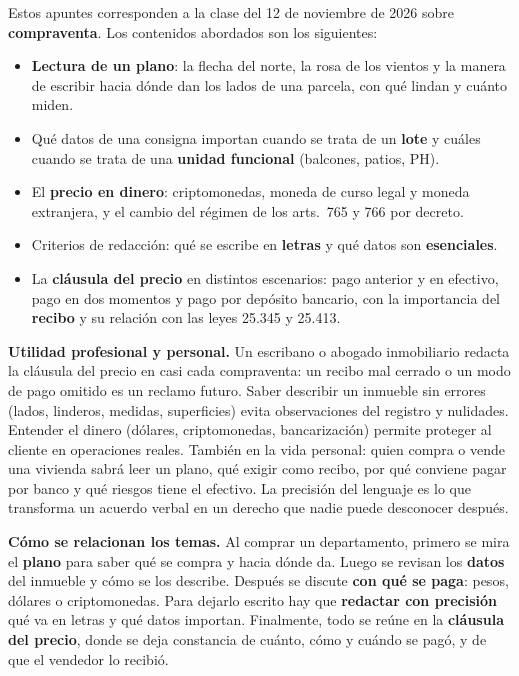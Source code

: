 \documentclass[12pt,oneside]{book}
\begin{document}
Estos apuntes corresponden a la clase del 12 de noviembre de 2026 sobre \textbf{compraventa}. Los contenidos abordados son los siguientes:

\begin{itemize}
    \item \textbf{Lectura de un plano}: la flecha del norte, la rosa de los vientos y la manera de escribir hacia dónde dan los lados de una parcela, con qué lindan y cuánto miden.
    \item Qué datos de una consigna importan cuando se trata de un \textbf{lote} y cuáles cuando se trata de una \textbf{unidad funcional} (balcones, patios, PH).
    \item El \textbf{precio en dinero}: criptomonedas, moneda de curso legal y moneda extranjera, y el cambio del régimen de los arts.~765 y 766 por decreto.
    \item Criterios de redacción: qué se escribe en \textbf{letras} y qué datos son \textbf{esenciales}.
    \item La \textbf{cláusula del precio} en distintos escenarios: pago anterior y en efectivo, pago en dos momentos y pago por depósito bancario, con la importancia del \textbf{recibo} y su relación con las leyes 25.345 y 25.413.
\end{itemize}

\begin{important}
\textbf{Utilidad profesional y personal.} Un escribano o abogado inmobiliario redacta la cláusula del precio en casi cada compraventa: un recibo mal cerrado o un modo de pago omitido es un reclamo futuro. Saber describir un inmueble sin errores (lados, linderos, medidas, superficies) evita observaciones del registro y nulidades. Entender el dinero (dólares, criptomonedas, bancarización) permite proteger al cliente en operaciones reales. También en la vida personal: quien compra o vende una vivienda sabrá leer un plano, qué exigir como recibo, por qué conviene pagar por banco y qué riesgos tiene el efectivo. La precisión del lenguaje es lo que transforma un acuerdo verbal en un derecho que nadie puede desconocer después.
\end{important}

\textbf{Cómo se relacionan los temas.} Al comprar un departamento, primero se mira el \textbf{plano} para saber qué se compra y hacia dónde da. Luego se revisan los \textbf{datos} del inmueble y cómo se los describe. Después se discute \textbf{con qué se paga}: pesos, dólares o criptomonedas. Para dejarlo escrito hay que \textbf{redactar con precisión} qué va en letras y qué datos importan. Finalmente, todo se reúne en la \textbf{cláusula del precio}, donde se deja constancia de cuánto, cómo y cuándo se pagó, y de que el vendedor lo recibió.
\end{document}
